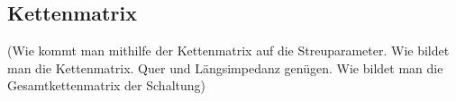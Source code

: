 \subsection{Kettenmatrix}\label{subsec:kettenmatrix}
(Wie kommt man mithilfe der Kettenmatrix auf die Streuparameter. Wie bildet man die Kettenmatrix. Quer und Längsimpedanz genügen. Wie bildet man die Gesamtkettenmatrix der Schaltung)